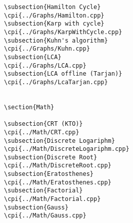 {\begin{verbatim}
\subsection{Hamilton Cycle}
\cpi{../Graphs/Hamilton.cpp}
\subsection{Karp with cycle}
\cpi{../Graphs/KarpWithCycle.cpp}
\subsection{Kuhn's algorithm}
\cpi{../Graphs/Kuhn.cpp}
\subsection{LCA}
\cpi{../Graphs/LCA.cpp}
\subsection{LCA offline (Tarjan)}
\cpi{../Graphs/LcaTarjan.cpp}


\section{Math}

\subsection{CRT (KTO)}
\cpi{../Math/CRT.cpp}
\subsection{Discrete Logariphm}
\cpi{../Math/DiscreteLogariphm.cpp}
\subsection{Discrete Root}
\cpi{../Math/DiscreteRoot.cpp}
\subsection{Eratosthenes}
\cpi{../Math/Eratosthenes.cpp}
\subsection{Factorial}
\cpi{../Math/Factorial.cpp}
\subsection{Gauss}
\cpi{../Math/Gauss.cpp}

\end{verbatim}}
